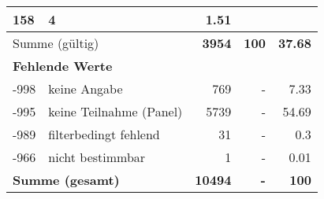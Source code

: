 \begin{longtable}{lXrrr}
       \num{158} &
       \num[round-mode=places,round-precision=2]{4} &
         \num[round-mode=places,round-precision=2]{1.51} \\
     \midrule
     \multicolumn{2}{l}{Summe (gültig)} &
       \textbf{\num{3954}} &
     \textbf{\num{100}} &
       \textbf{\num[round-mode=places,round-precision=2]{37.68}} \\
     \multicolumn{5}{l}{\textbf{Fehlende Werte}}\\
       -998 &
       keine Angabe &
         \num{769} &
        - &
         \num[round-mode=places,round-precision=2]{7.33} \\
       -995 &
       keine Teilnahme (Panel) &
         \num{5739} &
        - &
         \num[round-mode=places,round-precision=2]{54.69} \\
       -989 &
       filterbedingt fehlend &
         \num{31} &
        - &
         \num[round-mode=places,round-precision=2]{0.3} \\
       -966 &
       nicht bestimmbar &
         \num{1} &
        - &
         \num[round-mode=places,round-precision=2]{0.01} \\
     \midrule
     \multicolumn{2}{l}{\textbf{Summe (gesamt)}} &
          \textbf{\num{10494}} &
        \textbf{-} &
        \textbf{\num{100}} \\
     \bottomrule
     \end{longtable}
     
